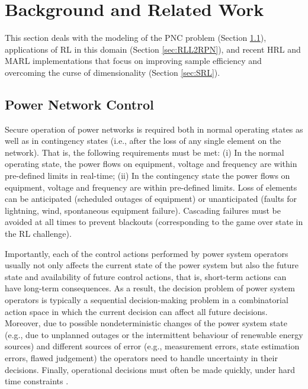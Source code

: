 \section{Background and Related Work}
\label{sec:background}
This section deals with the modeling of the PNC problem (Section \ref{sec:L2RPN}), applications of RL in this domain (Section \ref{sec:RLL2RPN}), and recent HRL and MARL implementations that focus on improving sample efficiency and overcoming the curse of dimensionality (Section \ref{sec:SRL}).

\subsection{Power Network Control}\label{sec:L2RPN}
Secure operation of power networks is required both in normal operating states as well as in contingency states (i.e., after the loss of any single element on the network). That is, the following requirements must be met: (i) In the normal operating state, the power flows on equipment, voltage and frequency are within pre-defined limits in real-time; (ii) In the contingency state the power flows on equipment, voltage and frequency are within pre-defined limits. Loss of elements can be anticipated (scheduled outages of
equipment) or unanticipated (faults for lightning, wind, spontaneous equipment failure). Cascading failures
must be avoided at all times to prevent blackouts (corresponding to the game over state in the RL challenge).

Importantly, each of the control actions performed by power system operators usually not only affects the
current state of the power system but also the future state and availability of future control actions, that
is, short-term actions can have long-term consequences. As a result, the decision problem of power system
operators is typically a sequential decision-making problem in a combinatorial action space in which the current decision can affect all
future decisions. Moreover, due to possible nondeterministic changes of the power system state (e.g., due
to unplanned outages or the intermittent behaviour of renewable energy sources) and different sources of
error (e.g., measurement errors, state estimation errors, flawed judgement) the operators need to handle
uncertainty in their decisions. Finally, operational decisions must often be made quickly, under hard time
constraints \cite{viebahn2022potential}.


